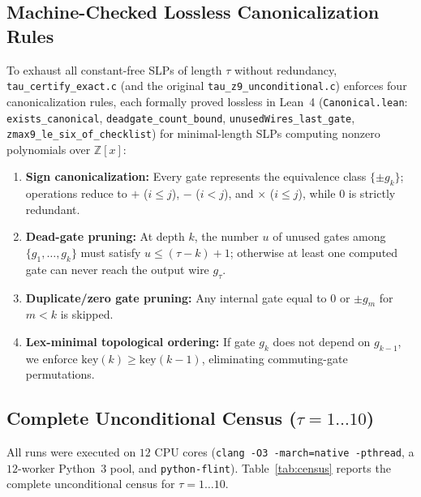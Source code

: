 \documentclass[11pt]{article}
\newcommand{\Z}{\mathbb{Z}}
\newcommand{\code}[1]{\texttt{#1}}
\begin{document}
\subsection{Machine-Checked Lossless Canonicalization Rules}
To exhaust all constant-free SLPs of length $\tau$ without redundancy, \code{tau\_certify\_exact.c} (and the original \code{tau\_z9\_unconditional.c}) enforces four canonicalization rules, each formally proved lossless in Lean~4 (\code{Canonical.lean}: \code{exists\_canonical}, \code{deadgate\_count\_bound}, \code{unusedWires\_last\_gate}, \code{zmax9\_le\_six\_of\_checklist}) for minimal-length SLPs computing nonzero polynomials over $\Z[x]$:
\begin{enumerate}[label=(\alph*),leftmargin=1.8em]
  \item \textbf{Sign canonicalization:} Every gate represents the equivalence class $\{\pm g_k\}$; operations reduce to $+$ ($i \le j$), $-$ ($i < j$), and $\times$ ($i \le j$), while $0$ is strictly redundant.
  \item \textbf{Dead-gate pruning:} At depth $k$, the number $u$ of unused gates among $\{g_1, \dots, g_k\}$ must satisfy $u \le (\tau - k) + 1$; otherwise at least one computed gate can never reach the output wire $g_\tau$.
  \item \textbf{Duplicate/zero gate pruning:} Any internal gate equal to $0$ or $\pm g_m$ for $m < k$ is skipped.
  \item \textbf{Lex-minimal topological ordering:} If gate $g_k$ does not depend on $g_{k-1}$, we enforce $\mathrm{key}(k) \ge \mathrm{key}(k-1)$, eliminating commuting-gate permutations.
\end{enumerate}

\subsection{Complete Unconditional Census ($\tau = 1 \dots 10$)}
All runs were executed on $12$ CPU cores (\code{clang -O3 -march=native -pthread}, a $12$-worker Python~3 pool, and \code{python-flint}). Table~\ref{tab:census} reports the complete unconditional census for $\tau = 1 \dots 10$.
\end{document}
